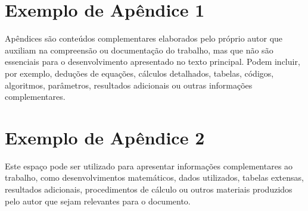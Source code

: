\appendix

\appendixpage
\addappheadtotoc

\section{Exemplo de Apêndice 1}
\label{sec:apendice_1}

Apêndices são conteúdos complementares elaborados pelo próprio autor que auxiliam na compreensão ou documentação do trabalho, mas que não são essenciais para o desenvolvimento apresentado no texto principal.
Podem incluir, por exemplo, deduções de equações, cálculos detalhados, tabelas, códigos, algoritmos, parâmetros, resultados adicionais ou outras informações complementares.

\clearpage

\section{Exemplo de Apêndice 2}
\label{sec:apendice_2}

Este espaço pode ser utilizado para apresentar informações complementares ao trabalho, como desenvolvimentos matemáticos, dados utilizados, tabelas extensas, resultados adicionais, procedimentos de cálculo ou outros materiais produzidos pelo autor que sejam relevantes para o documento.

\clearpage
